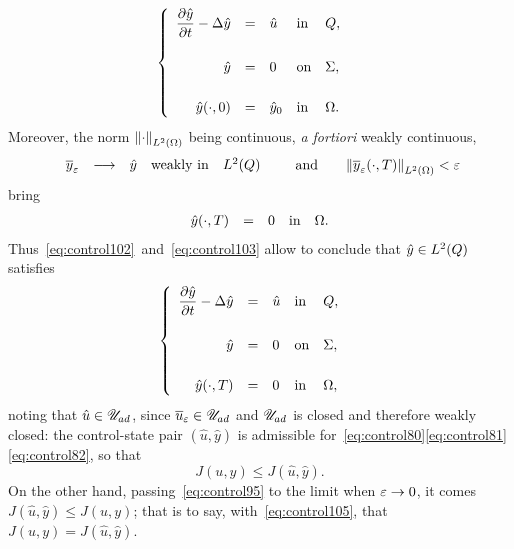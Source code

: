 \ie{}
\begin{equation}\label{eq:control102}
    \begin{cases}\displaystyle
        \begin{array}{rclll}
            \dfrac{\partial{}\hat{y}}{\partial{}t} - \Delta\hat{y} & = & \hat{u} &
            \text{in} & Q,\\
            \\
            \hat{y} & = & 0 & \text{on} & \Sigma,\\
            \\
            {\hat{y}}\!\left({\cdot, 0}\right) & = & {\hat{y}}_{0} & \text{in} &
            \Omega.
        \end{array}
    \end{cases}
\end{equation}
Moreover, the norm ${\left\|{\cdot }\right\|}_{L^{2}\left({\Omega}\right)}$ being continuous, \textit{a fortiori}
weakly continuous,
\begin{equation*}
    \begin{array}{rclll}
        {\overline{y}}_{\varepsilon} & \longrightarrow & \hat{y} & \text{weakly in} &
        L^{2}\!\left({Q}\right)
    \end{array}\qquad\text{and}\qquad
    {\left\|{ { {\overline{y}}_{\varepsilon} }\!\left({\cdot,T}\right)  }\right\|}_{L^{2}\left({\Omega}\right)} < \varepsilon
\end{equation*}
bring
\begin{equation}\label{eq:control103}
    \begin{array}{rclll}
        {\hat{y}}\!\left({\cdot,T}\right) & = & 0 & \text{in} & \Omega.
    \end{array}
\end{equation}
Thus~\eqref{eq:control102}~and~\eqref{eq:control103} allow to conclude that
$\hat{y}\in L^{2}\!\left({Q}\right)$ satisfies
\begin{equation*}
    \begin{cases}\displaystyle
        \begin{array}{rclll}
            \dfrac{\partial{}\hat{y}}{\partial{}t} - \Delta\hat{y} & = & \hat{u} &
            \text{in} & Q,\\
            \\
            \hat{y} & = & 0 & \text{on} & \Sigma,\\
            \\
            {\hat{y}}\!\left({\cdot,T}\right) & = & 0 & \text{in} & \Omega,
        \end{array}
    \end{cases}
\end{equation*}
noting that $\hat{u}\in{\mathscr{U}}_{ad}$, since ${\overline{u}}_{\varepsilon}\in{\mathscr{U}}_{ad}$ and ${\mathscr{U}}_{ad}$ is
closed and therefore weakly closed: the control-state pair
$\left({\hat{u},\hat{y}}\right)$ is admissible
for~\eqref{eq:control80}\eqref{eq:control81}\eqref{eq:control82}, so that
\begin{equation}\label{eq:control105}
    J(u,y)\leq J\!\left({\hat{u},\hat{y}}\right).
\end{equation}
On the other hand, passing~\eqref{eq:control95} to the limit when $\varepsilon\to
0$, it comes $J\!\left({\hat{u},\hat{y}}\right)\leq J(u,y)$; that is to
say, with~\eqref{eq:control105}, that $J(u,y) =
J\!\left({\hat{u},\hat{y}}\right)$.

